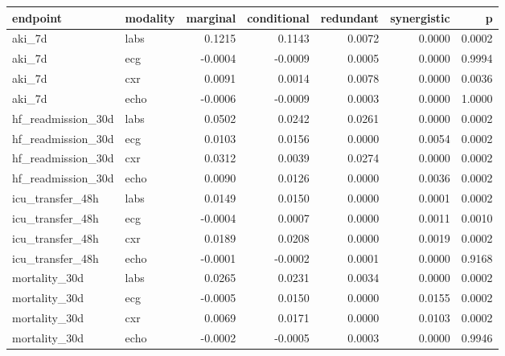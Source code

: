 \begin{tabular}{llrrrrr}
\toprule
\textbf{endpoint} & \textbf{modality} & \textbf{marginal} & \textbf{conditional} & \textbf{redundant} & \textbf{synergistic} & \textbf{p} \\
\midrule
aki\_7d & labs & 0.1215 & 0.1143 & 0.0072 & 0.0000 & 0.0002 \\
aki\_7d & ecg & -0.0004 & -0.0009 & 0.0005 & 0.0000 & 0.9994 \\
aki\_7d & cxr & 0.0091 & 0.0014 & 0.0078 & 0.0000 & 0.0036 \\
aki\_7d & echo & -0.0006 & -0.0009 & 0.0003 & 0.0000 & 1.0000 \\
hf\_readmission\_30d & labs & 0.0502 & 0.0242 & 0.0261 & 0.0000 & 0.0002 \\
hf\_readmission\_30d & ecg & 0.0103 & 0.0156 & 0.0000 & 0.0054 & 0.0002 \\
hf\_readmission\_30d & cxr & 0.0312 & 0.0039 & 0.0274 & 0.0000 & 0.0002 \\
hf\_readmission\_30d & echo & 0.0090 & 0.0126 & 0.0000 & 0.0036 & 0.0002 \\
icu\_transfer\_48h & labs & 0.0149 & 0.0150 & 0.0000 & 0.0001 & 0.0002 \\
icu\_transfer\_48h & ecg & -0.0004 & 0.0007 & 0.0000 & 0.0011 & 0.0010 \\
icu\_transfer\_48h & cxr & 0.0189 & 0.0208 & 0.0000 & 0.0019 & 0.0002 \\
icu\_transfer\_48h & echo & -0.0001 & -0.0002 & 0.0001 & 0.0000 & 0.9168 \\
mortality\_30d & labs & 0.0265 & 0.0231 & 0.0034 & 0.0000 & 0.0002 \\
mortality\_30d & ecg & -0.0005 & 0.0150 & 0.0000 & 0.0155 & 0.0002 \\
mortality\_30d & cxr & 0.0069 & 0.0171 & 0.0000 & 0.0103 & 0.0002 \\
mortality\_30d & echo & -0.0002 & -0.0005 & 0.0003 & 0.0000 & 0.9946 \\
\bottomrule
\end{tabular}
